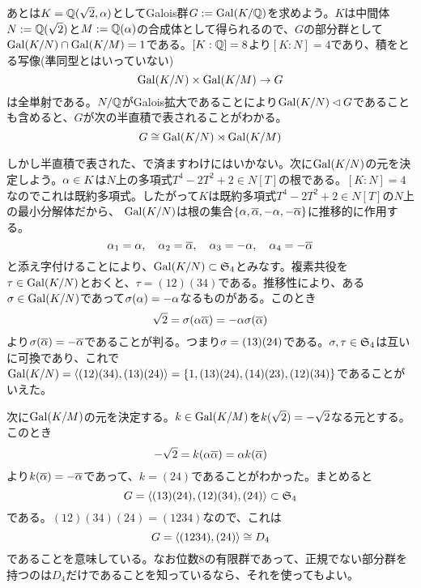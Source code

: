 \begin{sol}
あとは$K = {\mathbb Q}(\sqrt{2}, {\alpha})$としてGalois群$G := \operatorname{Gal}(K/{\mathbb Q})$を求めよう。$K$は中間体$N := {\mathbb Q}(\sqrt{2})$と$M := {\mathbb Q}({\alpha})$の合成体として得られるので、$G$の部分群として$\operatorname{Gal} (K/N) \cap \operatorname{Gal}(K/M) = 1$である。$[K:{\mathbb Q}] = 8$より$[K:N]=4$であり、積をとる写像(準同型とはいっていない)
\[
\operatorname{Gal} (K/N) \times \operatorname{Gal}(K/M) \to G
\]
は全単射である。$N/{\mathbb Q}$がGalois拡大であることにより$\operatorname{Gal}(K/N) \lhd G$であることも含めると、$G$が次の半直積で表されることがわかる。
\[
G \cong \operatorname{Gal} (K/N) \rtimes \operatorname{Gal}(K/M)
\]

しかし半直積で表された、で済ますわけにはいかない。次に$\operatorname{Gal}(K/N)$の元を決定しよう。${\alpha} \in K$は$N$上の多項式$T^4 - 2T^2 + 2 \in N[T]$の根である。$[K:N]=4$なのでこれは既約多項式。したがって$K$は既約多項式$T^4 - 2T^2 +2 \in N[T]$の$N$上の最小分解体だから、
$\operatorname{Gal}(K/N)$は根の集合$\{ {\alpha}, \overline{{\alpha}} , - {\alpha}, - \overline{{\alpha}} \}$に推移的に作用する。
\[
{\alpha}_1 = {\alpha} , \quad {\alpha}_2 = \overline{{\alpha}} , \quad {\alpha}_3 = - {\alpha} , \quad {\alpha}_4 = - \overline{{\alpha}}
\]
と添え字付けることにより、$\operatorname{Gal}(K/N) \subset \mathfrak{S}_4$とみなす。複素共役を$\tau \in \operatorname{Gal}(K/N)$とおくと、$\tau = (12)(34)$である。推移性により、ある${\sigma} \in \operatorname{Gal}(K/N)$であって${\sigma}({\alpha} ) = - {\alpha}$なるものがある。このとき
\[
\sqrt{2} = {\sigma}( {\alpha} \overline{{\alpha}} ) = - {\alpha}  {\sigma}(\overline{{\alpha}} )
\]
より${\sigma}( \overline{{\alpha}}) = - \overline{{\alpha}}$であることが判る。つまり${\sigma} = (13)(24)$である。${\sigma} , \tau \in \mathfrak{S}_4$は互いに可換であり、これで$\operatorname{Gal}(K/N) = \langle (12)(34) , (13)(24)  \rangle = \{ 1, (1 3)(2 4), (1  4)(2  3), (1  2)(3  4) \}$であることがいえた。

次に$\operatorname{Gal}(K/M)$の元を決定する。$k \in \operatorname{Gal}(K/M)$を$k(\sqrt{2}) = -\sqrt{2}$なる元とする。このとき
\[
- \sqrt{2} = k( {\alpha} \overline{{\alpha}}) = {\alpha} k( \overline{{\alpha}})
\]
より$k(\overline{{\alpha}}) = - \overline{{\alpha}}$であって、$k = (2 4)$であることがわかった。まとめると
\[
G = \langle  (1 3)(2 4), (1  2)(3  4) , (2 4)  \rangle \subset \mathfrak{S}_4
\]
である。$(12)(34)(24)=(1234)$なので、これは
\[
G = \langle  (1234), (24)  \rangle \cong D_4
\]
であることを意味している。なお位数$8$の有限群であって、正規でない部分群を持つのは$D_4$だけであることを知っているなら、それを使ってもよい。
\end{sol}


\newpage


\subsubsection{}%
\begin{sol}

\end{sol}
